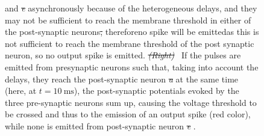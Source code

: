 \documentclass[brainsci, %
               review,accept,pdftex,moreauthors %
               ]{Definitions/mdpi}
\newcommand{\ms}{\si{\milli\second}}%
\providecommand{\DIFadd}[1]{{\protect\color{blue}\uwave{#1}}} %
\providecommand{\DIFdel}[1]{{\protect\color{red}\sout{#1}}}                      %
\providecommand{\DIFaddbegin}{} %
\providecommand{\DIFdelbegin}{} %
\providecommand{\DIFdelend}{} %
\providecommand{\DIFaddFL}[1]{\DIFadd{#1}} %
\providecommand{\DIFdelFL}[1]{\DIFdel{#1}} %
\providecommand{\DIFaddbeginFL}{} %
\providecommand{\DIFaddendFL}{} %
\providecommand{\DIFdelbeginFL}{} %
\providecommand{\DIFdelendFL}{} %
\newcommand{\DIFscaledelfig}{0.5}
\newlength{\DIFdelgraphicswidth} %
\newlength{\DIFdelgraphicsheight} %
\newcommand{\DIFaddincludegraphics}[2][]{{\color{blue}\fbox{\DIFOincludegraphics[#1]{#2}}}} %
\newcommand{\DIFdelincludegraphics}[2][]{%
\sbox{\DIFdelgraphicsbox}{\DIFOincludegraphics[#1]{#2}}%
\settoboxwidth{\DIFdelgraphicswidth}{\DIFdelgraphicsbox} %
\settoboxtotalheight{\DIFdelgraphicsheight}{\DIFdelgraphicsbox} %
\scalebox{\DIFscaledelfig}{%
\parbox[b]{\DIFdelgraphicswidth}{\usebox{\DIFdelgraphicsbox}\\[-\baselineskip] \rule{\DIFdelgraphicswidth}{0em}}\llap{\resizebox{\DIFdelgraphicswidth}{\DIFdelgraphicsheight}{%
\setlength{\unitlength}{\DIFdelgraphicswidth}%
\begin{picture}(1,1)%
\thicklines\linethickness{2pt} %
{\color[rgb]{1,0,0}\put(0,0){\framebox(1,1){}}}%
{\color[rgb]{1,0,0}\put(0,0){\line( 1,1){1}}}%
{\color[rgb]{1,0,0}\put(0,1){\line(1,-1){1}}}%
\end{picture}%
}\hspace*{3pt}}} %
} %
\DeclareRobustCommand{\DIFaddbegin}{\DIFOaddbegin \let\includegraphics\DIFaddincludegraphics} %
\DeclareRobustCommand{\DIFdelbegin}{\DIFOdelbegin \let\includegraphics\DIFdelincludegraphics} %
\DeclareRobustCommand{\DIFdelend}{\DIFOaddend \let\includegraphics\DIFOincludegraphics} %
\DeclareRobustCommand{\DIFaddbeginFL}{\DIFOaddbeginFL \let\includegraphics\DIFaddincludegraphics} %
\DeclareRobustCommand{\DIFaddendFL}{\DIFOaddendFL \let\includegraphics\DIFOincludegraphics} %
\DeclareRobustCommand{\DIFdelbeginFL}{\DIFOdelbeginFL \let\includegraphics\DIFdelincludegraphics} %
\DeclareRobustCommand{\DIFdelendFL}{\DIFOaddendFL \let\includegraphics\DIFOincludegraphics} %
\begin{document}
\begin{figure}[H]
{\DIFdelendFL \DIFaddbeginFL \textit{\DIFaddFL{a}} \DIFaddendFL and \DIFdelbeginFL \emph{\DIFdelFL{e}} %
\DIFdelendFL \DIFaddbeginFL \textit{\DIFaddFL{e}} \DIFaddendFL asynchronously because of the heterogeneous delays, and they may not be sufficient to reach the membrane threshold in either of the post-synaptic neurons\DIFdelbeginFL \DIFdelFL{, }\DIFdelendFL \DIFaddbeginFL \DIFaddFL{; }\DIFaddendFL therefore\DIFaddbeginFL \DIFaddFL{, }\DIFaddendFL no spike will be emitted\DIFaddbeginFL \DIFaddFL{, }\DIFaddendFL as this is not sufficient to reach the membrane threshold of the post synaptic neuron, so no output spike is emitted.
    \DIFdelbeginFL \emph{\DIFdelFL{(Right)}}%
\DIFdelendFL \DIFaddbeginFL {\DIFaddFL{(}\textbf{\DIFaddFL{Right}}\DIFaddFL{)}}\DIFaddendFL ~If the pulses are emitted from presynaptic neurons such that, taking into account the delays, they reach the post-synaptic neuron \DIFdelbeginFL \emph{\DIFdelFL{a}} %
\DIFdelendFL \DIFaddbeginFL \textit{\DIFaddFL{a}} \DIFaddendFL at the same time (here, at $t=10~\ms$),  the post-synaptic potentials evoked by the three pre-synaptic neurons sum up, causing the voltage threshold to be crossed and thus to the emission of an output spike (red color), while none is emitted from post-synaptic neuron \DIFdelbeginFL \emph{\DIFdelFL{e}}%
\DIFdelendFL \DIFaddbeginFL \textit{\DIFaddFL{e}}\DIFaddendFL .
     }
  \label{fig:izhikevich}
\end{figure}
%
\DIFdelbegin %

\DIFdelend %
\DIFaddbegin 
\end{document}
